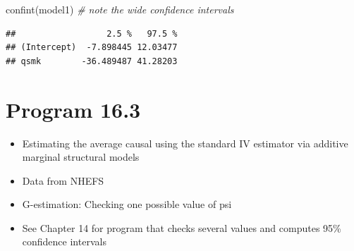 \documentclass[
  10pt,
]{book}
\newenvironment{Shaded}{\begin{snugshade}}{\end{snugshade}}
\newcommand{\AttributeTok}[1]{\textcolor[rgb]{0.77,0.63,0.00}{#1}}
\newcommand{\CommentTok}[1]{\textcolor[rgb]{0.56,0.35,0.01}{\textit{#1}}}
\newcommand{\FloatTok}[1]{\textcolor[rgb]{0.00,0.00,0.81}{#1}}
\newcommand{\FunctionTok}[1]{\textcolor[rgb]{0.00,0.00,0.00}{#1}}
\newcommand{\NormalTok}[1]{#1}
\newcommand{\OtherTok}[1]{\textcolor[rgb]{0.56,0.35,0.01}{#1}}
\newcommand{\SpecialCharTok}[1]{\textcolor[rgb]{0.00,0.00,0.00}{#1}}
\newcommand{\StringTok}[1]{\textcolor[rgb]{0.31,0.60,0.02}{#1}}
\providecommand{\tightlist}{%
  \setlength{\itemsep}{0pt}\setlength{\parskip}{0pt}}
\begin{document}
\begin{Shaded}
\begin{Highlighting}[]
\FunctionTok{confint}\NormalTok{(model1)  }\CommentTok{\# note the wide confidence intervals}
\end{Highlighting}
\end{Shaded}

\begin{verbatim}
##                  2.5 %   97.5 %
## (Intercept)  -7.898445 12.03477
## qsmk        -36.489487 41.28203
\end{verbatim}

\hypertarget{program-16.3}{%
\section{Program 16.3}\label{program-16.3}}

\begin{itemize}
\tightlist
\item
  Estimating the average causal using the standard IV estimator via additive marginal structural models
\item
  Data from NHEFS
\item
  G-estimation: Checking one possible value of psi
\item
  See Chapter 14 for program that checks several values and computes 95\% confidence intervals
\end{itemize}

\begin{Shaded}
\end{Shaded}
\end{document}
